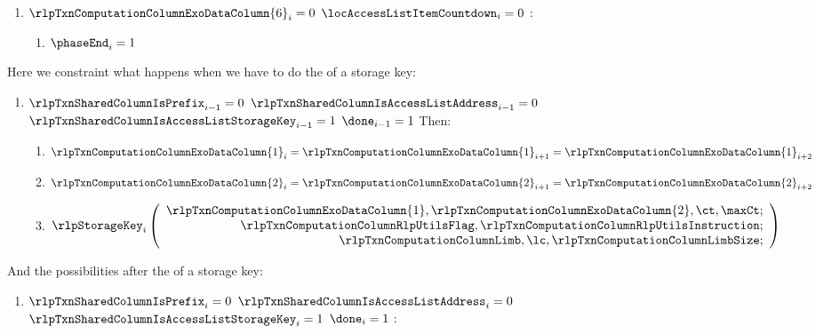 \begin{enumerate}[resume]
\begin{enumerate}[resume]
\begin{enumerate}
					\item \If $\rlpTxnComputationColumnExoDataColumn{6} _{i} = 0$ \et $\locAccessListItemCountdown _{i} = 0$ \Then:
						\begin{enumerate}
							\item $\phaseEnd _{i} = 1$
						\end{enumerate}
				\end{enumerate}
		\end{enumerate}

		Here we constraint what happens when we have to do the \rlp{} of a storage key:
		\begin{enumerate}[resume]
			\item \If $\rlpTxnSharedColumnIsPrefix _{i - 1} = 0$ \et $\rlpTxnSharedColumnIsAccessListAddress _{i - 1} = 0$ \et $\rlpTxnSharedColumnIsAccessListStorageKey _{i - 1} = 1$ \et $\done _{i - 1} =1$ Then:
				\begin{enumerate}
					\item $\rlpTxnComputationColumnExoDataColumn{1} _{i} = \rlpTxnComputationColumnExoDataColumn{1} _{i + 1} = \rlpTxnComputationColumnExoDataColumn{1} _{i + 2}$
					\item $\rlpTxnComputationColumnExoDataColumn{2} _{i} = \rlpTxnComputationColumnExoDataColumn{2} _{i + 1} = \rlpTxnComputationColumnExoDataColumn{2} _{i + 2}$
					\item \[
							\rlpStorageKey _{i}
							\left(
							\begin{array}{r}
								\rlpTxnComputationColumnExoDataColumn{1},
								\rlpTxnComputationColumnExoDataColumn{2},
								\ct,
								\maxCt; \\
								\rlpTxnComputationColumnRlpUtilsFlag,
								\rlpTxnComputationColumnRlpUtilsInstruction; \\
								\rlpTxnComputationColumnLimb,
								\lc,
								\rlpTxnComputationColumnLimbSize; \\
							\end{array}
							\right)
						\]
				\end{enumerate}
		\end{enumerate}
		And the possibilities after the \rlp{} of a storage key:
		\begin{enumerate}[resume]
			\item \If $\rlpTxnSharedColumnIsPrefix _{i} = 0$ \et $\rlpTxnSharedColumnIsAccessListAddress _{i} = 0$ \et $\rlpTxnSharedColumnIsAccessListStorageKey _{i} = 1$ \et $\done _{i} =1$ \Then:
				\begin{enumerate}

\end{enumerate}
\end{enumerate}
\end{enumerate}

